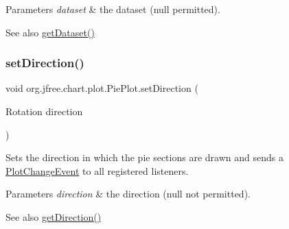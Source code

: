 \begin{DoxyParams}{Parameters}
{\em dataset} & the dataset ({\ttfamily null} permitted).\\
\hline
\end{DoxyParams}
\begin{DoxySeeAlso}{See also}
\mbox{\hyperlink{classorg_1_1jfree_1_1chart_1_1plot_1_1_pie_plot_a9216c489ef9e69e91dfc3207b7ab80bb}{get\+Dataset()}} 
\end{DoxySeeAlso}
\mbox{\label{classorg_1_1jfree_1_1chart_1_1plot_1_1_pie_plot_a771df380edf05a0b83596b7b82002856}} 
\subsubsection{\texorpdfstring{set\+Direction()}{setDirection()}}
{\footnotesize\ttfamily void org.\+jfree.\+chart.\+plot.\+Pie\+Plot.\+set\+Direction (\begin{DoxyParamCaption}\item[{Rotation}]{direction }\end{DoxyParamCaption})}

Sets the direction in which the pie sections are drawn and sends a \mbox{\hyperlink{}{Plot\+Change\+Event}} to all registered listeners.


\begin{DoxyParams}{Parameters}
{\em direction} & the direction ({\ttfamily null} not permitted).\\
\hline
\end{DoxyParams}
\begin{DoxySeeAlso}{See also}
\mbox{\hyperlink{classorg_1_1jfree_1_1chart_1_1plot_1_1_pie_plot_a5406b9adefa8fa24d4328cf9c652abce}{get\+Direction()}} 
\end{DoxySeeAlso}
\mbox{\label{classorg_1_1jfree_1_1chart_1_1plot_1_1_pie_plot_a1532467123505f9c3fee0171804871fa}} 
